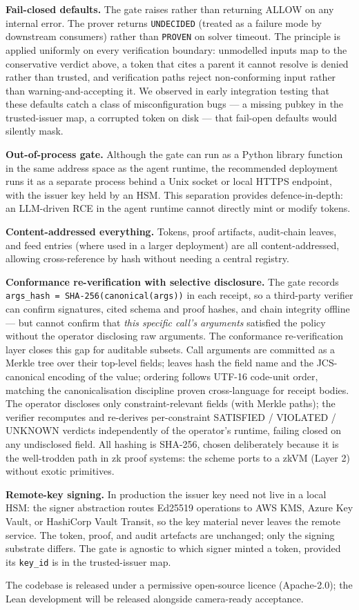 \textbf{Fail-closed defaults.} The gate raises rather than returning
ALLOW on any internal error. The prover returns \texttt{UNDECIDED}
(treated as a failure mode by downstream consumers) rather than
\texttt{PROVEN} on solver timeout. The principle is applied uniformly on
every verification boundary: unmodelled inputs map to the conservative
verdict above, a token that cites a parent it cannot resolve is denied
rather than trusted, and verification paths reject non-conforming input
rather than warning-and-accepting it. We observed in early integration
testing that these defaults catch a class of misconfiguration bugs --- a
missing pubkey in the trusted-issuer map, a corrupted token on disk ---
that fail-open defaults would silently mask.

\textbf{Out-of-process gate.} Although the gate can run as a Python
library function in the same address space as the agent runtime, the
recommended deployment runs it as a separate process behind a Unix
socket or local HTTPS endpoint, with the issuer key held by an HSM. This
separation provides defence-in-depth: an LLM-driven RCE in the agent
runtime cannot directly mint or modify tokens.

\textbf{Content-addressed everything.} Tokens, proof artifacts,
audit-chain leaves, and feed entries (where used in a larger deployment)
are all content-addressed, allowing cross-reference by hash without
needing a central registry.

\textbf{Conformance re-verification with selective disclosure.} The gate
records \texttt{args\_hash\ =\ SHA-256(canonical(args))} in each
receipt, so a third-party verifier can confirm signatures, cited schema
and proof hashes, and chain integrity offline --- but cannot confirm
that \emph{this specific call's arguments} satisfied the policy without
the operator disclosing raw arguments. The conformance re-verification
layer closes this gap for auditable subsets. Call arguments are
committed as a Merkle tree over their top-level fields; leaves hash the
field name and the JCS-canonical encoding of the value; ordering follows
UTF-16 code-unit order, matching the canonicalisation discipline proven
cross-language for receipt bodies. The operator discloses only
constraint-relevant fields (with Merkle paths); the verifier recomputes
and re-derives per-constraint SATISFIED / VIOLATED / UNKNOWN verdicts
independently of the operator's runtime, failing closed on any
undisclosed field. All hashing is SHA-256, chosen deliberately because
it is the well-trodden path in zk proof systems: the scheme ports to a
zkVM (Layer 2) without exotic primitives.

\textbf{Remote-key signing.} In production the issuer key need not live
in a local HSM: the signer abstraction routes Ed25519 operations to AWS
KMS, Azure Key Vault, or HashiCorp Vault Transit, so the key material
never leaves the remote service. The token, proof, and audit artefacts
are unchanged; only the signing substrate differs. The gate is agnostic
to which signer minted a token, provided its \texttt{key\_id} is in the
trusted-issuer map.

The codebase is released under a permissive open-source licence
(Apache-2.0); the Lean development will be released alongside
camera-ready acceptance.
